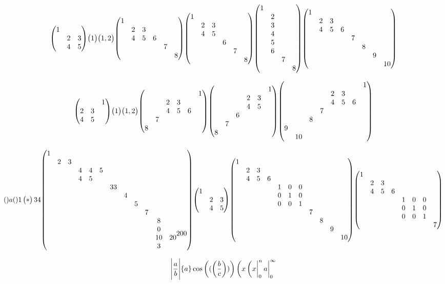 \documentclass{article}
\begin{document}
\[
  \mqty(\dmat{1,2&3\\4&5})
  \mqty(\dmat 1)
  \mqty(\dmat 1,2)
  \mqty(\dmat{1,2&3\\4&5&6,7,8})
  \mqty(\dmat{1,2&3\\4&5,6,7,8})
  \mqty(\dmat{1,2\\3\\4\\5\\6,7,8})
  \mqty(\dmat{1,2&3\\4&5&6,7,8,\dmat{9,10}})
\]


\[
  \mqty(\admat{1,2&3\\4&5})
  \mqty(\admat 1)
  \mqty(\admat 1,2)
  \mqty(\admat{1,2&3\\4&5&6,7,8})
  \mqty(\admat{1,2&3\\4&5,6,7,8})
  \mqty(\admat{1,2&3\\4&5&6,7,8,\dmat{9,10}})
\]

\[ 
  \mqty a
  \mqty1
  \pmqty* 34
  \mqty(\dmat{1,2&3,4&4&5\\4&5,33,4,5,7,8\\0\\10&20\\3,200}) 
  \mqty(\dmat{1,2&3\\4&5}) 
  \mqty(\dmat{1,2&3\\4&5&6,\imat{3},7,8,\dmat{9,10}})
  \mqty(\mqty{1}\\ & \mqty{2 & 3\\ 4 & 5 & 6}\\ & & \mqty{\imat{3}} \\ & & & \mqty{7})
\]

\newpage

\[\qty\Bigg|\frac{a}{b}|
  \qty{a}\cos
  \qty((\qty(\frac{b}{c})))
  \eval(x\eval(x|_0^n a |_0^\infty 
\]
\end{document}
